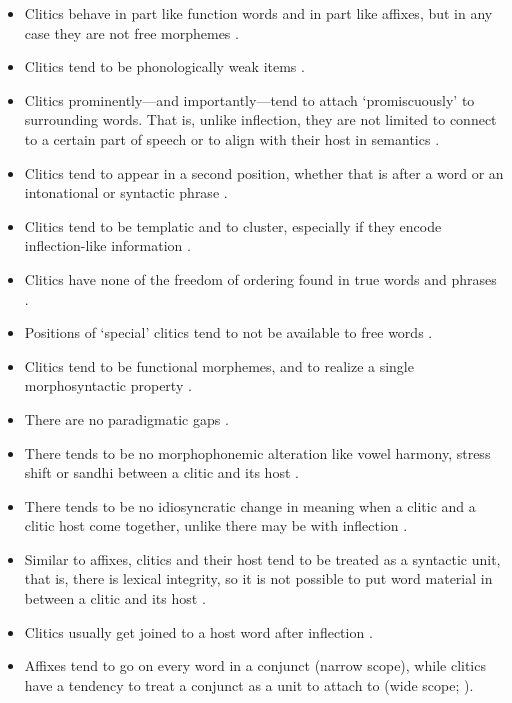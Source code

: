 \begin{itemize}
	\item Clitics behave in part like function words and in part like affixes, 
		but in any case they are not free morphemes 
		\citep[38, 42]{spencerluis2012}.
	\item Clitics tend to be phonologically weak items 
		\citep[39]{spencerluis2012}.
	\item Clitics prominently---and importantly---tend to attach 
		`promiscuously' to surrounding words. That is, unlike inflection, they 
		are not limited to connect to a certain part of speech or to align 
		with their host in semantics \citep[40, 108–109]{spencerluis2012}.
	\item Clitics tend to appear in a second position, whether that is after a 
		word or an intonational or syntactic phrase 
		\citep[41]{spencerluis2012}.
	\item Clitics tend to be templatic and to cluster, especially if they 
		encode inflection-like information \citep[41, 47--48]{spencerluis2012}.
	\item Clitics have none of the freedom of ordering found in true words and 
		phrases \citep[43]{spencerluis2012}.
	\item Positions of `special' clitics tend to not be available to free 
		words \citep[44]{spencerluis2012}.
	\item Clitics tend to be functional morphemes, and to realize a single 
		morphosyntactic property \citep[67, 179]{spencerluis2012}.
	\item There are no paradigmatic gaps \citep[108--109]{spencerluis2012}.
	\item There tends to be no morphophonemic alteration like vowel harmony, 
		stress shift or sandhi between a clitic and its host 
		\citep[108--109]{spencerluis2012}.
	\item There tends to be no idiosyncratic change in meaning when a clitic 
		and a clitic host come together, unlike there may be with inflection 
		\citep[108, 110]{spencerluis2012}.
	\item Similar to affixes, clitics and their host tend to be treated as a 
		syntactic unit, that is, there is lexical integrity, so it is not possible to put word material in between a clitic and its host 
		\citep[108, 110]{spencerluis2012}.
	\item Clitics usually get joined to a host word after inflection 
		\citep[108, 110]{spencerluis2012}.
	\item Affixes tend to go on every word in a conjunct (narrow scope), while 
		clitics have a tendency to treat a conjunct as a unit to attach to 
		(wide scope; \cite[139, 196\psqq]{spencerluis2012}).
\end{itemize}

